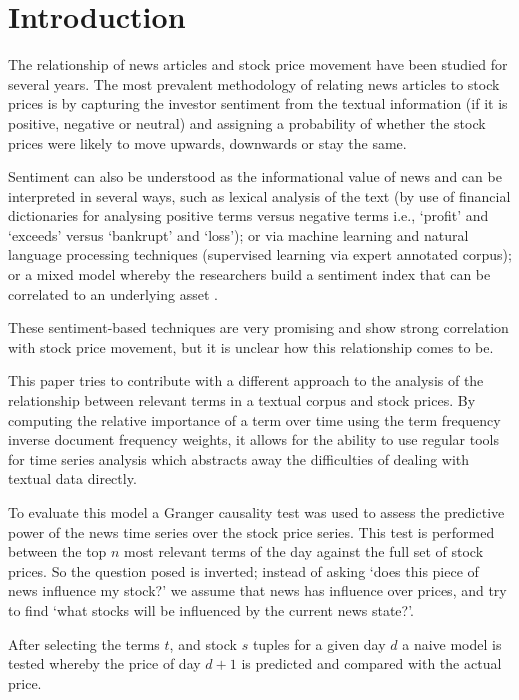\documentclass{article}
\begin{document}
\section{Introduction}
The relationship of news articles and stock price movement have been studied for several years. The most prevalent methodology of relating news articles to stock prices is by capturing the investor sentiment \citep{Handbook} from the textual information (if it is positive, negative or neutral) and assigning a probability of whether the stock prices were likely to move upwards, downwards or stay the same. 
\par
Sentiment can also be understood as the informational value of news and can be interpreted in several ways, such as lexical analysis of the text \citep{GRAB ORIGINAL CITATIONPAGE 10 HANDBOOK} (by use of financial dictionaries for analysing positive terms versus negative terms i.e., `profit' and `exceeds' versus `bankrupt' and `loss'); or via machine learning and natural language processing techniques \citep{GRAB ORIGINAL CITATIONPAGE 10 HANDBOOK} (supervised learning via expert annotated corpus); or a mixed model \citep{GRAB ORIGINAL CITATIONPAGE 10 HANDBOOK} whereby the researchers build a sentiment index that can be correlated to an underlying asset \citep{GRAN ORIGINAL CITATION - PAGE 10 HANDBOOK}.
\par
These sentiment-based techniques are very promising and show strong correlation with stock price movement, but it is unclear how this relationship comes to be.
\par
This paper tries to contribute with a different approach to the analysis of the relationship between relevant terms in a textual corpus and stock prices. By computing the relative importance of a term over time using the term frequency inverse document frequency \citep{TF-IDF paper} weights, it allows for the ability to use regular tools for time series analysis which abstracts away the difficulties of dealing with textual data directly.
\par
To evaluate this model a Granger causality test \citep{GRANGER TEST} was used to assess the predictive power of the news time series over the stock price series. This test is performed between the top \(n\) most relevant terms of the day against the full set of stock prices. So the question posed is inverted; instead of asking `does this piece of news influence my stock?' we assume that news has influence over prices, and try to find `what stocks will be influenced by the current news state?'.
\par
After selecting the terms \(t\), and stock \(s\) tuples for a given day \(d\) a naive model is tested whereby the price of day \(d+1\) is predicted and compared with the actual price.
\end{document}

